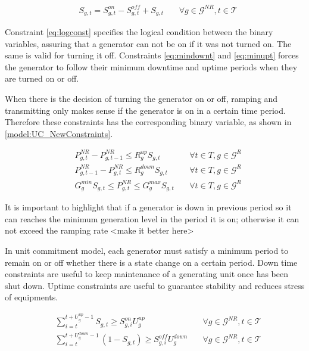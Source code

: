 \documentclass[12pt,LUDisStyle,twosided]{book}
\newcommand{\mc}{\mathcal}
\begin{document}
\begin{subequations}\label{model:ucConstraints}
\begin{alignat}{4}
& S_{g,t} = S^{on}_{g,t} - S^{off}_{g,t} + S_{g,t}  &~& \forall g \in \mc{G}^{NR} , t \in \mc{T} \label{eq:logconst}\end{alignat} 
\end{subequations}

Constraint \ref{eq:logconst} specifies the logical condition between the binary variables, assuring that a generator can not be on if it was not turned on. The same is valid for turning it off. Constraints \ref{eq:mindownt} and \ref{eq:minupt} forces the generator to follow their minimum downtime and uptime periods when they are turned on or off. 

When there is the decision of turning the generator on or off, ramping and transmitting only makes sense if the generator is on in a certain time period. Therefore these constraints has the corresponding binary variable, as shown in \ref{model:UC_NewConstraints}.

\begin{subequations}\label{model:UC_NewConstraints}
\begin{alignat}{4}
& P^{NR}_{g,t} - P^{NR}_{g,t - 1} \leq R^{up}_{g} S_{g,t} &~& \forall t \in T, g \in \mc{G}^{R}\label{eq:UCrampUpRateConstraint} \\
& P^{NR}_{g,t -1 } - P^{NR}_{g,t} \leq R^{down}_{g} S_{g,t} &~& \forall t \in T, g \in \mc{G}^{R}\label{eq:UCrampDownRateConstraint} \\
& G^{min}_{g} S_{g,t}\leq P^{NR}_{g,t} \leq G^{max}_{g} S_{g,t} &~& \forall t \in T, g \in \mc{G}^{R}\label{eq:UCgenerationBounds}
\end{alignat} 
\end{subequations}
 
It is important to highlight that if a generator is down in previous period so it can reaches the minimum generation level in the period it is on; otherwise it can not exceed the ramping rate <make it better here>

In unit commitment model, each generator must satisfy a minimum period to remain on or off whether there is a state change on a certain period. Down time constraints are  useful to keep maintenance of a generating unit once has been shut down. Uptime constraints are useful to guarantee stability and reduces stress of equipments. 

\begin{subequations}\label{model:ucMinDownUpConstraints}
\begin{alignat}{4}
& \sum_{i = t}^{t + U^{up}_{g} - 1} S_{g,t} \geq S^{on}_{g,i} U^{up}_{g} &~& \forall g \in \mc{G}^{NR}, t \in \mc{T} \label{eq:mindownt} \\
& \sum_{i = t}^{t + U^{down}_{g} - 1} (1 -S_{g,t}) \geq S^{off}_{g,i} U^{down}_{g} &~& \forall g \in \mc{G}^{NR}, t \in \mc{T} \label{eq:minupt}
\end{alignat} 
\end{subequations}
\end{document}
